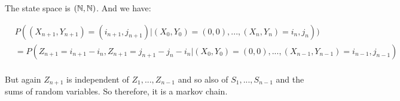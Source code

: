 
The state space is $(\Bbb N, \Bbb N)$. And we have:

\begin{align*}
&P((X_{n+1},Y_{n+1}) =(i_{n+1},j_{n+1})| (X_0,Y_0)=(0,0),...,(X_n,Y_n)=i_n,j_n)) \\&= P(Z_{n+1}=i_{n+1}-i_n,Z_{n+1}=j_{n+1}-j_{n}-i_n | (X_0,Y_0)=(0,0),...,(X_{n-1},Y_{n-1})=i_{n-1},j_{n-1}) \\
\end{align*}

But again $Z_{n+1}$ is independent of $Z_1,...,Z_{n-1}$ and so also of $S_1,...,S_{n-1}$ and the sums of random variables. So therefore, it is a markov chain. 